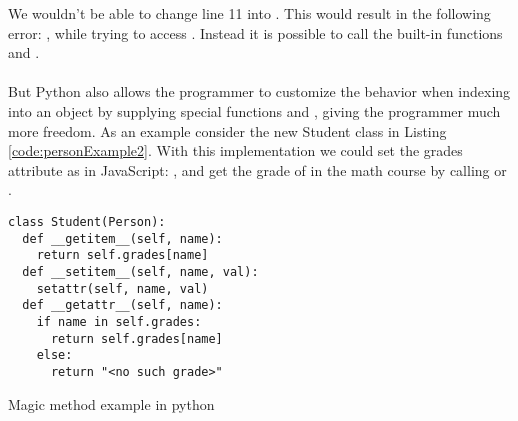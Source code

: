 We wouldn't be able to change line 11 into . This would result in the following error: , while trying to access . Instead it is possible to call the built-in functions  and . \\
\\
But Python also allows the programmer to customize the behavior when indexing into an object by supplying special functions  and , giving the programmer much more freedom. As an example consider the new Student class in Listing \ref{code:personExample2}. With this implementation we could set the grades attribute as in JavaScript: , and get the grade of  in the math course by calling  or .

\begin{listing}[H]
\begin{verbatim}
class Student(Person):
  def __getitem__(self, name):
    return self.grades[name]
  def __setitem__(self, name, val):
    setattr(self, name, val)
  def __getattr__(self, name):
    if name in self.grades:
      return self.grades[name]
    else:
      return "<no such grade>"
\end{verbatim}
	\caption{Magic method example in python}
	\label{code:personExample2}
\end{listing}